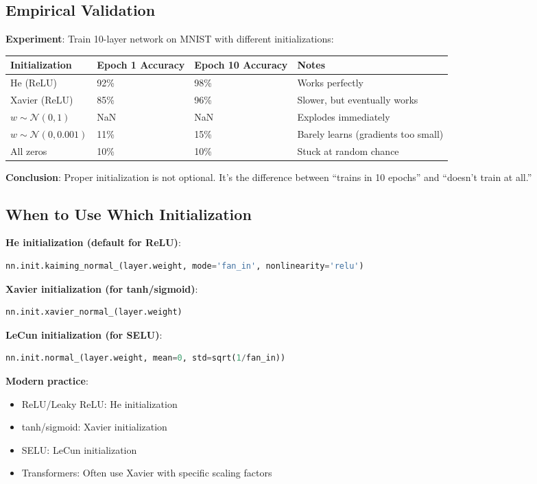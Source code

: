 \subsection{Empirical Validation}

\textbf{Experiment}: Train 10-layer network on MNIST with different initializations:

\begin{table}[h]
\centering
\begin{tabular}{llll}
\toprule
\textbf{Initialization} & \textbf{Epoch 1 Accuracy} & \textbf{Epoch 10 Accuracy} & \textbf{Notes} \\
\midrule
He (ReLU) & 92\% & 98\% & Works perfectly \\
Xavier (ReLU) & 85\% & 96\% & Slower, but eventually works \\
$w \sim \mathcal{N}(0, 1)$ & NaN & NaN & Explodes immediately \\
$w \sim \mathcal{N}(0, 0.001)$ & 11\% & 15\% & Barely learns (gradients too small) \\
All zeros & 10\% & 10\% & Stuck at random chance \\
\bottomrule
\end{tabular}
\end{table}

\textbf{Conclusion}: Proper initialization is not optional. It's the difference between ``trains in 10 epochs'' and ``doesn't train at all.''

\subsection{When to Use Which Initialization}

\textbf{He initialization (default for ReLU)}:
\begin{lstlisting}[language=Python]
nn.init.kaiming_normal_(layer.weight, mode='fan_in', nonlinearity='relu')
\end{lstlisting}

\textbf{Xavier initialization (for tanh/sigmoid)}:
\begin{lstlisting}[language=Python]
nn.init.xavier_normal_(layer.weight)
\end{lstlisting}

\textbf{LeCun initialization (for SELU)}:
\begin{lstlisting}[language=Python]
nn.init.normal_(layer.weight, mean=0, std=sqrt(1/fan_in))
\end{lstlisting}

\textbf{Modern practice}:
\begin{itemize}
\item ReLU/Leaky ReLU: He initialization
\item tanh/sigmoid: Xavier initialization
\item SELU: LeCun initialization
\item Transformers: Often use Xavier with specific scaling factors
\end{itemize}

